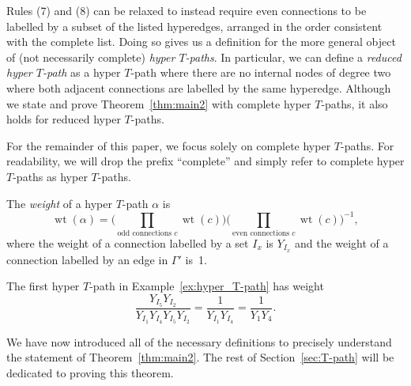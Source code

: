 \documentclass[10pt,a4paper]{amsart}
\numberwithin{equation}{section}
\DeclareMathOperator{\wt}{wt}
\begin{document}
\begin{Remark}
 Rules (7) and (8) can be relaxed to instead require even connections to be labelled by a subset of the listed hyperedges, arranged in the order consistent with the complete list. Doing so gives us a definition for the more general object of (not necessarily complete) \emph{hyper $T$-paths}. In particular, we can define a \emph{reduced hyper $T$-path} as a hyper $T$-path where there are no internal nodes of degree two where both adjacent connections are labelled by the same hyperedge. Although we state and prove Theorem~\ref{thm:main2} with complete hyper $T$-paths, it also holds for reduced hyper $T$-paths.
\end{Remark}
For the remainder of this paper, we focus solely on complete hyper $T$-paths. For readability, we will drop the prefix ``complete'' and simply refer to complete hyper $T$-paths as hyper $T$-paths.
\begin{Definition}
The \emph{weight} of a hyper $T$-path $\alpha$ is \[ \wt(\alpha)=\bigg(\prod_{\text{odd connections }c} \wt(c)\bigg)\bigg(\prod_{\text{even connections }c} \wt(c)\bigg)^{-1},\]
where the weight of a connection labelled by a set $I_x$ is $Y_{I_x}$ and the weight of a connection labelled by an edge in $\Gamma'$ is~1.
\end{Definition}
\begin{Example}
The first hyper $T$-path in Example~\ref{ex:hyper_T-path} has weight \[\frac{Y_{I_5}Y_{I_2}}{Y_{I_1}Y_{I_4}Y_{I_5}Y_{I_2}}=\frac{1}{Y_{I_1}Y_{I_4}}=\frac{1}{Y_1Y_4}.\]
\end{Example}
We have now introduced all of the necessary definitions to precisely understand the statement of Theorem~\ref{thm:main2}. The rest of Section~\ref{sec:T-path} will be dedicated to proving this theorem.
\end{document}
